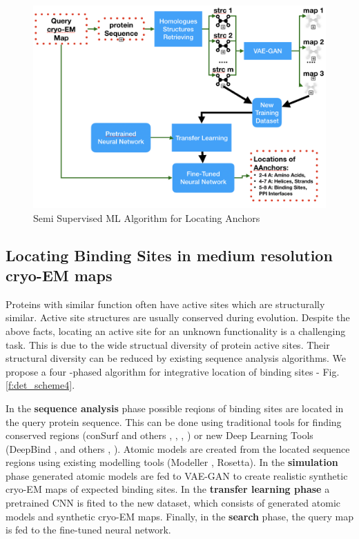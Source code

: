 \begin{figure}
  \centering
	\includegraphics[scale=0.4]{picsnew/semi_super.png}
  \caption{Semi Supervised ML Algorithm for Locating Anchors}\label{f:semi_super}
\end{figure}



\subsection{Locating  Binding Sites in medium resolution cryo-EM maps }\label{bs_task}
Proteins with similar function often have active sites which are structurally similar. 
Active site structures  are usually conserved during evolution.
Despite the above facts, locating an active site for an unknown functionality is a challenging task.
This is due to the wide structual diversity of protein active sites.
Their  structural diversity can be reduced by existing sequence analysis algorithms. 
We propose a  four -phased algorithm for integrative location of binding sites - Fig.\ref{f:det_scheme4}.

In the \textbf{sequence analysis} phase possible reqions of binding sites are located in the query protein sequence.
This  can be done using traditional tools for finding conserved regions (conSurf \cite{Ashkenazy2010}  and others  \cite{Capra2007},  \cite{Fischer2008},  \cite{Rausell2010},  \cite{Lopez2011} ) or new Deep Learning Tools  (DeepBind \cite{Alipanahi2015}, and others \cite{Cui2019},  \cite{Chen2011ATPsiteResidues}).
Atomic models are created from the located sequence regions using existing modelling tools (Modeller , Rosetta).
In the \textbf{simulation} phase generated atomic models
are fed to VAE-GAN to create realistic synthetic cryo-EM maps of  expected binding  sites.
In the \textbf{transfer learning phase}  a pretrained CNN is fited to the new dataset, which consists of generated atomic models and synthetic cryo-EM maps.
Finally, in the \textbf{search} phase, the query map is fed to the fine-tuned neural network. 

